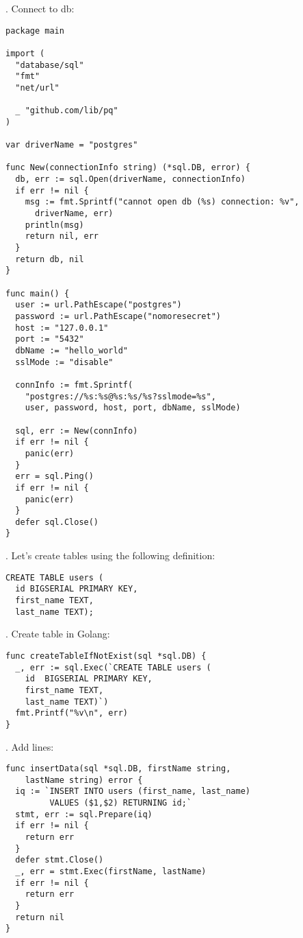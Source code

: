\documentclass[11pt, letterpaper]{article}
\begin{document}
. Connect to db:

\begin{verbatim}
package main

import (
  "database/sql"
  "fmt"
  "net/url"

  _ "github.com/lib/pq"
)

var driverName = "postgres"

func New(connectionInfo string) (*sql.DB, error) {
  db, err := sql.Open(driverName, connectionInfo)
  if err != nil {
    msg := fmt.Sprintf("cannot open db (%s) connection: %v", 
      driverName, err)
    println(msg)
    return nil, err
  }
  return db, nil
}

func main() {
  user := url.PathEscape("postgres")
  password := url.PathEscape("nomoresecret")
  host := "127.0.0.1"
  port := "5432"
  dbName := "hello_world"
  sslMode := "disable"

  connInfo := fmt.Sprintf(
    "postgres://%s:%s@%s:%s/%s?sslmode=%s",
    user, password, host, port, dbName, sslMode)

  sql, err := New(connInfo)
  if err != nil {
    panic(err)
  }
  err = sql.Ping()
  if err != nil {
    panic(err)
  }
  defer sql.Close()
}
\end{verbatim}

. Let's create tables using the following definition:

\begin{verbatim}
CREATE TABLE users (
  id BIGSERIAL PRIMARY KEY,
  first_name TEXT,
  last_name TEXT);
\end{verbatim}

. Create table in Golang:

\begin{verbatim}
func createTableIfNotExist(sql *sql.DB) {
  _, err := sql.Exec(`CREATE TABLE users (
    id  BIGSERIAL PRIMARY KEY,
    first_name TEXT,
    last_name TEXT)`)
  fmt.Printf("%v\n", err)
}
\end{verbatim}

. Add lines:

\begin{verbatim}
func insertData(sql *sql.DB, firstName string,
    lastName string) error {
  iq := `INSERT INTO users (first_name, last_name)
         VALUES ($1,$2) RETURNING id;`
  stmt, err := sql.Prepare(iq)
  if err != nil {
    return err
  }
  defer stmt.Close()
  _, err = stmt.Exec(firstName, lastName)
  if err != nil {
    return err
  }
  return nil
}
\end{verbatim}
\end{document}
